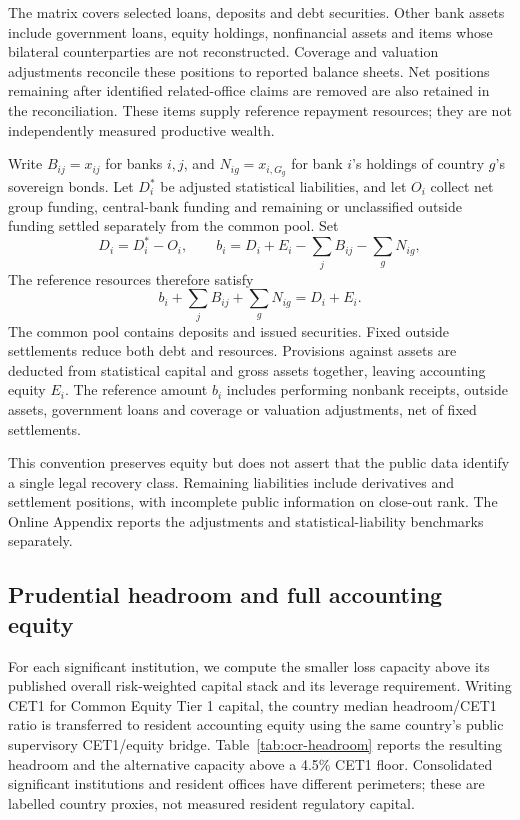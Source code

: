 The matrix covers selected loans, deposits and debt securities. Other bank assets include government loans, equity holdings, nonfinancial assets and items whose bilateral counterparties are not reconstructed. Coverage and valuation adjustments reconcile these positions to reported balance sheets. Net positions remaining after identified related-office claims are removed are also retained in the reconciliation. These items supply reference repayment resources; they are not independently measured productive wealth.

Write $B_{ij}=x_{ij}$ for banks $i,j$, and $N_{ig}=x_{i,G_g}$ for bank $i$'s holdings of country $g$'s sovereign bonds. Let $D_i^*$ be adjusted statistical liabilities, and let $O_i$ collect net group funding, central-bank funding and remaining or unclassified outside funding settled separately from the common pool. Set
\[
 D_i=D_i^*-O_i,\qquad
 b_i=D_i+E_i-\sum_jB_{ij}-\sum_gN_{ig},
\]
The reference resources therefore satisfy
\[
 b_i+\sum_jB_{ij}+\sum_gN_{ig}=D_i+E_i.
\]
The common pool contains deposits and issued securities. Fixed outside settlements reduce both debt and resources. Provisions against assets are deducted from statistical capital and gross assets together, leaving accounting equity $E_i$. The reference amount $b_i$ includes performing nonbank receipts, outside assets, government loans and coverage or valuation adjustments, net of fixed settlements.

This convention preserves equity but does not assert that the public data identify a single legal recovery class. Remaining liabilities include derivatives and settlement positions, with incomplete public information on close-out rank. The Online Appendix reports the adjustments and statistical-liability benchmarks separately.

\subsection{Prudential headroom and full accounting equity}

For each significant institution, we compute the smaller loss capacity above its published overall risk-weighted capital stack and its leverage requirement. Writing CET1 for Common Equity Tier 1 capital, the country median headroom/CET1 ratio is transferred to resident accounting equity using the same country's public supervisory CET1/equity bridge. Table~\ref{tab:ocr-headroom} reports the resulting headroom and the alternative capacity above a 4.5\% CET1 floor. Consolidated significant institutions and resident offices have different perimeters; these are labelled country proxies, not measured resident regulatory capital.

